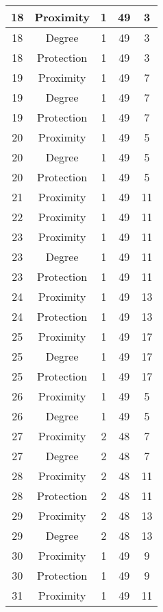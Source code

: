 \documentclass[results.tex]{subfiles}
\begin{document}
\begin{center}
\begin{tabular}{| c || c | c | c | c |}
    \hline
    18 & Proximity & 1 & 49 & 3 \\ 
    \hline
    18 & Degree & 1 & 49 & 3 \\ 
    \hline
    18 & Protection & 1 & 49 & 3 \\ 
    \hline
    19 & Proximity & 1 & 49 & 7 \\ 
    \hline
    19 & Degree & 1 & 49 & 7 \\ 
    \hline
    19 & Protection & 1 & 49 & 7 \\ 
    \hline
    20 & Proximity & 1 & 49 & 5 \\ 
    \hline
    20 & Degree & 1 & 49 & 5 \\ 
    \hline
    20 & Protection & 1 & 49 & 5 \\ 
    \hline
    21 & Proximity & 1 & 49 & 11 \\ 
    \hline
    22 & Proximity & 1 & 49 & 11 \\ 
    \hline
    23 & Proximity & 1 & 49 & 11 \\ 
    \hline
    23 & Degree & 1 & 49 & 11 \\ 
    \hline
    23 & Protection & 1 & 49 & 11 \\ 
    \hline
    24 & Proximity & 1 & 49 & 13 \\ 
    \hline
    24 & Protection & 1 & 49 & 13 \\ 
    \hline
    25 & Proximity & 1 & 49 & 17 \\ 
    \hline
    25 & Degree & 1 & 49 & 17 \\ 
    \hline
    25 & Protection & 1 & 49 & 17 \\ 
    \hline
    26 & Proximity & 1 & 49 & 5 \\ 
    \hline
    26 & Degree & 1 & 49 & 5 \\ 
    \hline
    27 & Proximity & 2 & 48 & 7 \\ 
    \hline
    27 & Degree & 2 & 48 & 7 \\ 
    \hline
    28 & Proximity & 2 & 48 & 11 \\ 
    \hline
    28 & Protection & 2 & 48 & 11 \\ 
    \hline
    29 & Proximity & 2 & 48 & 13 \\ 
    \hline
    29 & Degree & 2 & 48 & 13 \\ 
    \hline
    30 & Proximity & 1 & 49 & 9 \\ 
    \hline
    30 & Protection & 1 & 49 & 9 \\ 
    \hline
    31 & Proximity & 1 & 49 & 11 \\ 

\end{tabular}
\end{center}
\end{document}
